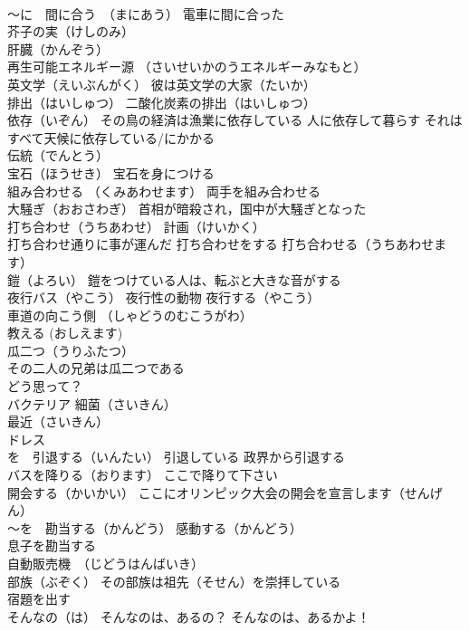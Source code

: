 \documentclass[8pt]{extreport}
\begin{document}
\begin{CJK}{UTF8}{min}
\\	～に　間に合う　（まにあう） 電車に間に合った
\\	芥子の実（けしのみ）
\\	肝臓（かんぞう）
\\	再生可能エネルギー源 （さいせいかのうエネルギーみなもと）
\\	英文学（えいぶんがく） 彼は英文学の大家（たいか）
\\	排出（はいしゅつ） 二酸化炭素の排出（はいしゅつ）
\\	依存（いぞん） その鳥の経済は漁業に依存している 人に依存して暮らす それはすべて天候に依存している/にかかる
\\	伝統（でんとう）
\\	宝石（ほうせき） 宝石を身につける
\\	組み合わせる （くみあわせます） 両手を組み合わせる
\\	大騒ぎ（おおさわぎ） 首相が暗殺され，国中が大騒ぎとなった
\\	打ち合わせ（うちあわせ） 計画（けいかく）
\\	打ち合わせ通りに事が運んだ 打ち合わせをする 打ち合わせる（うちあわせます）
\\	鎧（よろい） 鎧をつけている人は、転ぶと大きな音がする
\\	夜行バス（やこう） 夜行性の動物 夜行する（やこう）
\\	車道の向こう側 （しゃどうのむこうがわ）
\\	教える (おしえます)
\\	瓜二つ（うりふたつ） 
\\	その二人の兄弟は瓜二つである
\\	どう思って？
\\	バクテリア 細菌（さいきん） 
\\	最近（さいきん）
\\	ドレス
\\	を　引退する（いんたい） 引退している 政界から引退する
\\	バスを降りる（おります） ここで降りて下さい
\\	開会する（かいかい） ここにオリンピック大会の開会を宣言します（せんげん）
\\	～を　勘当する（かんどう） 感動する（かんどう）
\\	息子を勘当する
\\	自動販売機　（じどうはんばいき）
\\	部族（ぶぞく） その部族は祖先（そせん）を崇拝している
\\	宿題を出す
\\	そんなの（は） そんなのは、あるの？ そんなのは、あるかよ！

\end{CJK}
\end{document}
